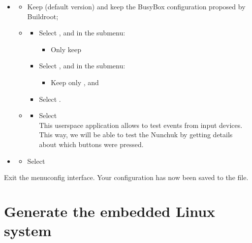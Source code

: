 \begin{itemize}
\begin{itemize}
\end{itemize}
\item {}
  \begin{itemize}
  \item Keep  (default version) and keep the BusyBox
    configuration proposed by Buildroot;
  \item {}
    \begin{itemize}
    \item Select , and in the submenu:
    \begin{itemize}
         \item Only keep 
    \end{itemize}
    \item Select , and in the submenu:
    \begin{itemize}
         \item Keep only ,  and 
    \end{itemize}
    \item Select .
    \end{itemize}
  \item {}
    \begin{itemize}
	 \item Select \\
	       This userspace application allows to test events from
	       input devices. This way, we will be able to test the
	       Nunchuk by getting details about which buttons were
	       pressed.
    \end{itemize}
  \end{itemize}
\item {}
  \begin{itemize}
  \item Select 
  \end{itemize}
\end{itemize}

Exit the menuconfig interface. Your configuration has now been saved
to the  file.

\section{Generate the embedded Linux system}

